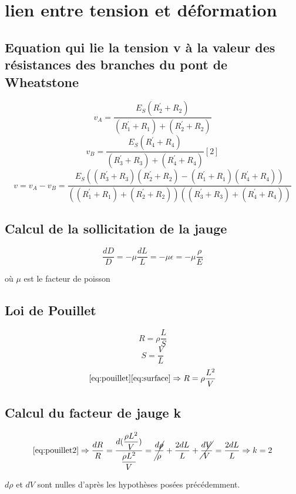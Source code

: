 \documentclass[11pt,a4paper]{report}
\begin{document}
\chapter{lien entre tension et déformation}
\section*{Equation  qui lie la tension v à la valeur des résistances des branches du pont de Wheatstone}
\begin{equation}v_{A} = \dfrac{E_{S}(R^{'}_{2}+R_{2})}{(R^{'}_{1}+R_{1})+(R^{'}_{2}+R_{2})}\end{equation} 
\begin{equation}v_{B} = \dfrac{E_{S}(R^{'}_{4}+R_{4})}{(R^{'}_{3}+R_{3})+(R^{'}_{4}+R_{4})} [2]\end{equation} 
\begin{equation}
v = v_{A} - v_{B} = \dfrac{E_{S}((R^{'}_{3}+R_{3})(R^{'}_{2}+R_{2})-(R^{'}_{1}+R_{1})(R^{'}_{4}+R_{4}))}{((R^{'}_{1}+R_{1})+(R^{'}_{2}+R_{2}))((R^{'}_{3}+R_{3})+(R^{'}_{4}+R_{4}))} \end{equation} 

\section*{Calcul de la sollicitation de la jauge}
\begin{equation}
\label{eq:poisson}
\dfrac{dD}{D} = - \mu \dfrac{dL}{L} = - \mu \epsilon =  - \mu \dfrac{\rho}{E}
\end{equation}
\begin{center}où $\mu$ est le facteur de poisson\end{center}
\section*{Loi de Pouillet}
\begin{equation}
\label{eq:pouillet}
R = \rho \dfrac{L}{S}
\end{equation}
\begin{equation}
\label{eq:surface}
 S  = \dfrac{V}{L} 
\end{equation}
\begin{equation}
\label{eq:pouillet2}
\eqref{eq:pouillet}\eqref{eq:surface} \Rightarrow  R = \rho \dfrac{L^{2}}{V}
 \end{equation}
\section*{Calcul du facteur de jauge k}
\begin{equation}
\eqref{eq:pouillet2} \Rightarrow \dfrac{dR}{R} = \dfrac{d(\dfrac{\rho L^{2}}{V})}{\dfrac{\rho L^{2}}{V}} =  \cancel{\dfrac{d\rho}{\rho}}+ \dfrac{2dL}{L}+\cancel{\dfrac{dV}{V}}  =  \dfrac{2dL}{L} \Rightarrow k = 2
\end{equation}
\begin{center}$d\rho$ et $dV$ sont nulles d'après les hypothèses posées précédemment.\end{center}
\end{document}
